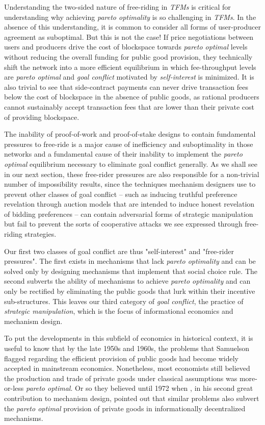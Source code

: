 Understanding the two-sided nature of free-riding in \textit{TFMs} is critical for understanding why achieving \textit{pareto optimality} is so challenging in \textit{TFMs}. In the absence of this understanding, it is common to consider all forms of user-producer agreement as suboptimal. But this is not the case! If price negotiations between users and producers drive the cost of blockspace towards \textit{pareto optimal} levels without reducing the overall funding for public good provision, they technically shift the network into a more efficient equilibrium in which fee-throughput levels are \textit{pareto optimal} and \textit{goal conflict} motivated by \textit{self-interest} is minimized. It is also trivial to see that side-contract payments can never drive transaction fees below the cost of blockspace in the absence of public goods, as rational producers cannot sustainably accept transaction fees that are lower than their private cost of providing blockspace. 

The inability of proof-of-work and proof-of-stake designs to contain fundamental pressures to free-ride is a major cause of inefficiency and suboptimality in those networks and a fundamental cause of their inability to implement the \textit{pareto optimal} equilibrium necessary to eliminate goal conflict generally. As we shall see in our next section, these free-rider pressures are also responsible for a non-trivial number of impossibility results, since the techniques mechanism designers use to prevent other classes of goal conflict -- such as inducing truthful preference revelation through auction models that are intended to induce honest revelation of bidding preferences -- can contain adversarial forms of strategic manipulation but fail to prevent the sorts of cooperative attacks we see expressed through free-riding strategies.

Our first two classes of goal conflict are thus "self-interest" and "free-rider pressures". The first exists in mechanisms that lack \textit{pareto optimality} and can be solved only by designing mechanisms that implement that social choice rule. The second subverts the ability of mechanisms to achieve \textit{pareto optimality} and can only be rectified by eliminating the public goods that lurk within their incentive sub-structures. This leaves our third category of \textit{goal conflict}, the practice of \textit{strategic manipulation}, which is the focus of informational economics and mechanism design. 

To put the developments in this subfield of economics in historical context, it is useful to know that by the late 1950s and 1960s, the problems that Samuelson flagged regarding the efficient provision of public goods had become widely accepted in mainstream economics. Nonetheless, most economists still believed the production and trade of private goods under classical assumptions was more-or-less \textit{pareto optimal}. Or so they believed until 1972 when \citet{hurwicz1973design}, in his second great contribution to mechanism design, pointed out that similar problems also subvert the \textit{pareto optimal} provision of private goods in informationally decentralized mechanisms. 

